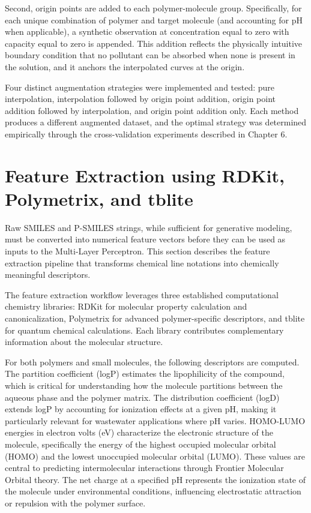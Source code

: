 Second, origin points are added to each polymer-molecule group. Specifically, for each unique combination of polymer and target molecule (and accounting for pH when applicable), a synthetic observation at concentration equal to zero with capacity equal to zero is appended. This addition reflects the physically intuitive boundary condition that no pollutant can be absorbed when none is present in the solution, and it anchors the interpolated curves at the origin.

Four distinct augmentation strategies were implemented and tested: pure interpolation, interpolation followed by origin point addition, origin point addition followed by interpolation, and origin point addition only. Each method produces a different augmented dataset, and the optimal strategy was determined empirically through the cross-validation experiments described in Chapter 6.

\section{Feature Extraction using RDKit, Polymetrix, and tblite}
\label{sec:feature_extraction}

Raw SMILES and P-SMILES strings, while sufficient for generative modeling, must be converted into numerical feature vectors before they can be used as inputs to the Multi-Layer Perceptron. This section describes the feature extraction pipeline that transforms chemical line notations into chemically meaningful descriptors.

The feature extraction workflow leverages three established computational chemistry libraries: RDKit for molecular property calculation and canonicalization, Polymetrix for advanced polymer-specific descriptors, and tblite for quantum chemical calculations. Each library contributes complementary information about the molecular structure.

For both polymers and small molecules, the following descriptors are computed. The partition coefficient (logP) estimates the lipophilicity of the compound, which is critical for understanding how the molecule partitions between the aqueous phase and the polymer matrix. The distribution coefficient (logD) extends logP by accounting for ionization effects at a given pH, making it particularly relevant for wastewater applications where pH varies. HOMO-LUMO energies in electron volts (eV) characterize the electronic structure of the molecule, specifically the energy of the highest occupied molecular orbital (HOMO) and the lowest unoccupied molecular orbital (LUMO). These values are central to predicting intermolecular interactions through Frontier Molecular Orbital theory. The net charge at a specified pH represents the ionization state of the molecule under environmental conditions, influencing electrostatic attraction or repulsion with the polymer surface.

